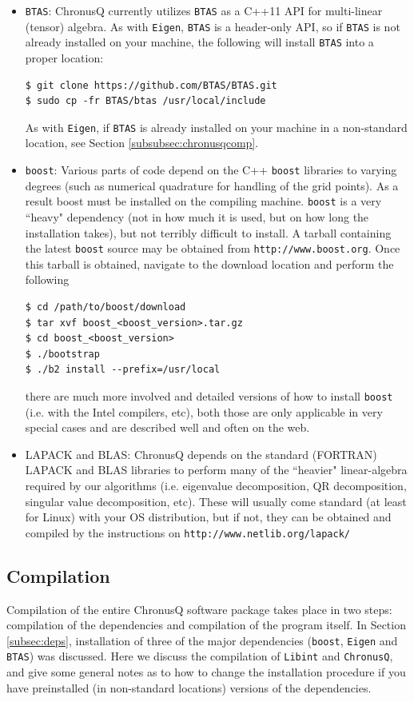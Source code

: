\documentclass[12pt]{article}
\begin{document}
\begin{itemize}
\item \texttt{BTAS}: ChronusQ currently utilizes \texttt{BTAS} as a C++11 API for multi-linear (tensor) algebra. As with \texttt{Eigen}, \texttt{BTAS} is a header-only API, so if \texttt{BTAS} is not already installed on your machine, the following will install \texttt{BTAS} into a proper location:
\begin{lstlisting}
$ git clone https://github.com/BTAS/BTAS.git
$ sudo cp -fr BTAS/btas /usr/local/include
\end{lstlisting}
As with \texttt{Eigen}, if \texttt{BTAS} is already installed on your machine in a non-standard location, see Section \ref{subsubsec:chronusqcomp}.

\item \texttt{boost}: Various parts of code depend on the C++ \texttt{boost} libraries to varying degrees (such as numerical quadrature for handling of the grid points). As a result boost must be installed on the compiling machine. \texttt{boost} is a very ``heavy" dependency (not in how much it is used, but on how long the installation takes), but not terribly difficult to install. A tarball containing the latest \texttt{boost} source may be obtained from \texttt{http://www.boost.org}. Once this tarball is obtained, navigate to the download location and perform the following
\begin{lstlisting}
$ cd /path/to/boost/download
$ tar xvf boost_<boost_version>.tar.gz
$ cd boost_<boost_version>
$ ./bootstrap
$ ./b2 install --prefix=/usr/local
\end{lstlisting}
there are much more involved and detailed versions of how to install \texttt{boost} (i.e. with the Intel compilers, etc), both those are only applicable in very special cases and are described well and often on the web.

\item LAPACK and BLAS: ChronusQ depends on the standard (FORTRAN) LAPACK and BLAS libraries to perform many of the ``heavier" linear-algebra required by our algorithms (i.e. eigenvalue decomposition, QR decomposition, singular value decomposition, etc). These will usually come standard (at least for Linux) with your OS distribution, but if not, they can be obtained and compiled by the instructions on \texttt{http://www.netlib.org/lapack/}
\end{itemize}

\subsection{Compilation}
Compilation of the entire ChronusQ software package takes place in two steps: compilation of the dependencies and compilation of the program itself. In Section \ref{subsec:deps}, installation of three of the major dependencies (\texttt{boost}, \texttt{Eigen} and \texttt{BTAS}) was discussed. Here we discuss the compilation of \texttt{Libint} and \texttt{ChronusQ}, and give some general notes as to how to change the installation procedure if you have preinstalled (in non-standard locations) versions of the dependencies.
\end{document}
